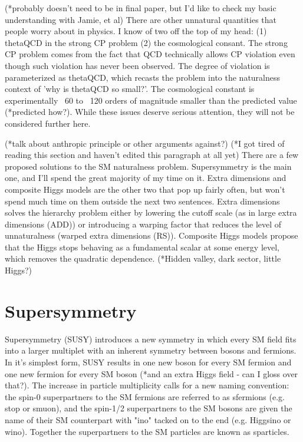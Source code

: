 \documentclass[12pt]{article}
\begin{document}
    (*probably doesn't need to be in final paper, but I'd like to check my basic understanding with Jamie, et al)
    There are other unnatural quantities that people worry about in physics. I know of two off the top of my head: (1) thetaQCD in the strong CP problem (2) the cosmological consant. The strong CP problem comes from the fact that QCD technically allows CP violation even though such violation has never been observed. The degree of violation is parameterized as thetaQCD, which recasts the problem into the naturalness context of 'why is thetaQCD so small?'. The cosmological constant is experimentally ~60 to ~120 orders of magnitude smaller than the predicted value (*predicted how?). While these issues deserve serious attention, they will not be considered further here.
    
    (*talk about anthropic principle or other arguments against?)
    (*I got tired of reading this section and haven't edited this paragraph at all yet)
    There are a few proposed solutions to the SM naturalness problem. Supersymmetry is the main one, and I'll spend the great majority of my time on it. Extra dimensions and composite Higgs models are the other two that pop up fairly often, but won't spend much time on them outside the next two sentences. Extra dimensions solves the hierarchy problem either by lowering the cutoff scale (as in large extra dimensions (ADD)) or introducing a warping factor that reduces the level of unnaturalness (warped extra dimensions (RS)). Composite Higgs models propose that the Higgs stops behaving as a fundamental scalar at some energy level, which removes the quadratic dependence. (*Hidden valley, dark sector, little Higgs?)
    
\section{Supersymmetry}
    Supersymmetry (SUSY) introduces a new symmetry in which every SM field fits into a larger multiplet with an inherent symmetry between bosons and fermions. In it's simplest form, SUSY results in one new boson for every SM fermion and one new fermion for every SM boson (*and an extra Higgs field - can I gloss over that?). The increase in particle multiplicity calls for a new naming convention: the spin-0 superpartners to the SM fermions are referred to as sfermions (e.g. stop or smuon), and the spin-1/2 superpartners to the SM bosons are given the name of their SM counterpart with "ino" tacked on to the end (e.g. Higgsino or wino). Together the superpartners to the SM particles are known as sparticles. 
\end{document}
